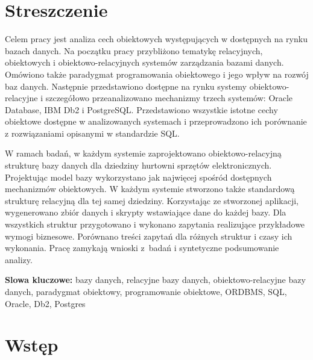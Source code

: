 \documentclass[a4paper,twoside,12pt]{book}
\newcounter{stronyPozaNumeracja}
\begin{document}
\pagestyle{tylkoNumeryStron}
\tableofcontents

\setcounter{stronyPozaNumeracja}{\value{page}}
\mainmatter


\pagestyle{empty}

\chapter*{Streszczenie}

Celem pracy jest analiza cech obiektowych występujących w dostępnych na rynku bazach danych. Na początku pracy przybliżono tematykę relacyjnych, obiektowych i obiektowo-relacyjnych systemów zarządzania bazami danych. Omówiono także paradygmat programowania obiektowego i jego wpływ na rozwój baz danych. Następnie przedstawiono dostępne na rynku systemy obiektowo-relacyjne i szczegółowo przeanalizowano mechanizmy trzech systemów: Oracle Database, IBM Db2 i PostgreSQL. Przedstawiono wszystkie istotne cechy obiektowe dostępne w analizowanych systemach i przeprowadzono ich porównanie z rozwiązaniami opisanymi w standardzie SQL.

W ramach badań, w każdym systemie zaprojektowano obiektowo-relacyjną strukturę bazy danych dla dziedziny hurtowni sprzętów elektronicznych. Projektując model bazy wykorzystano jak najwięcej spośród dostępnych mechanizmów obiektowych. W każdym systemie stworzono także standardową strukturę relacyjną dla tej samej dziedziny. Korzystając ze stworzonej aplikacji, wygenerowano zbiór danych i skrypty wstawiające dane do każdej bazy. Dla wszystkich struktur przygotowano i wykonano zapytania realizujące przykładowe wymogi biznesowe. Porównano treści zapytań dla różnych struktur i czasy ich wykonania. Pracę zamykają wnioski z~badań i syntetyczne podsumowanie analizy.

{\bf Slowa kluczowe:} bazy danych, relacyjne bazy danych, obiektowo-relacyjne bazy danych, paradygmat obiektowy, programowanie obiektowe, ORDBMS, SQL, Oracle, Db2, Postgres


\cleardoublepage

\pagestyle{NumeryStronNazwyRozdzialow}


\chapter{Wstęp}
\end{document}
